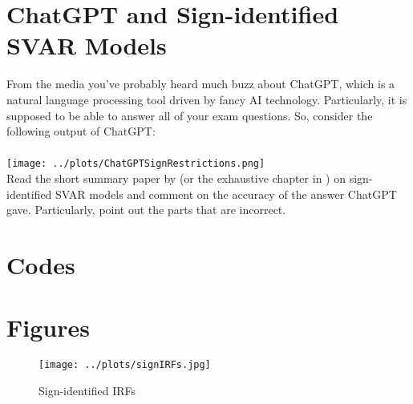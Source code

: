 \documentclass{article}
\begin{document}
\newpage

\section[ChatGPT and Sign-identified SVAR Models]{ChatGPT and Sign-identified SVAR Models\label{ex:ChatGPTSignSVAR}}
From the media you've probably heard much buzz about ChatGPT,
  which is a natural language processing tool driven by fancy AI technology.
Particularly, it is supposed to be able to answer all of your exam questions.
So, consider the following output of ChatGPT:
\\~\\
\texttt{[image: ../plots/ChatGPTSignRestrictions.png]}
~\\
\noindent Read the short summary paper by \textcite{Wolf_2022_WhatCanWe} (or the exhaustive chapter in \textcite[Ch.~13]{Kilian.Lutkepohl_2017_StructuralVectorAutoregressive})
on sign-identified SVAR models and comment on the accuracy of the answer ChatGPT gave.
Particularly, point out the parts that are incorrect.


\newpage


\appendix

\printbibliography
\newpage
\section{Codes}


\newpage

\section{Figures}
\begin{figure}[htbp]\caption[]{Sign-identified IRFs}\label{fig:signSVAR}
	\texttt{[image: ../plots/signIRFs.jpg]}
\end{figure}
\end{document}

